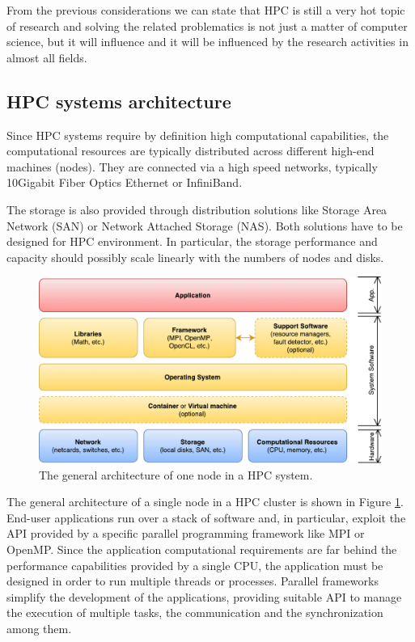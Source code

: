 From the previous considerations we can state that HPC is still a very hot
topic of research and solving the related problematics is not just a matter
of computer science, but it will influence and it will be influenced by
the research activities in almost all fields.



\subsection{HPC systems architecture}
Since HPC systems require by definition high computational capabilities, the
computational resources are typically distributed across different high-end
machines (nodes). They are connected via a high speed networks, typically
10Gigabit Fiber Optics Ethernet or InfiniBand.

The storage is also provided through distribution solutions like
Storage Area Network (SAN) or Network Attached Storage (NAS).
Both solutions have to be designed for
HPC environment. In particular, the storage performance and capacity
should possibly scale linearly with the numbers of nodes and disks.

\begin{figure}[t]
		\centerline 
{\includegraphics[scale=0.7]{img/cap1-generalarchitecture.pdf}}
		\caption[General architecture of a HPC node]{The general architecture of one node in a HPC system.}
		\label{fig:generalarchitecture}
\end{figure}

The general architecture of a single node in a HPC cluster is shown in
Figure \ref{fig:generalarchitecture}. End-user applications run over
a stack of software and, in particular, exploit the API provided
by a specific parallel programming framework like MPI or OpenMP. Since the
application computational requirements are far behind the performance
capabilities provided by a single CPU, the application must be designed in
order to run multiple threads or processes. Parallel frameworks
simplify the development of the applications, providing suitable API to
manage the execution of multiple tasks, the communication and the
synchronization among them.


